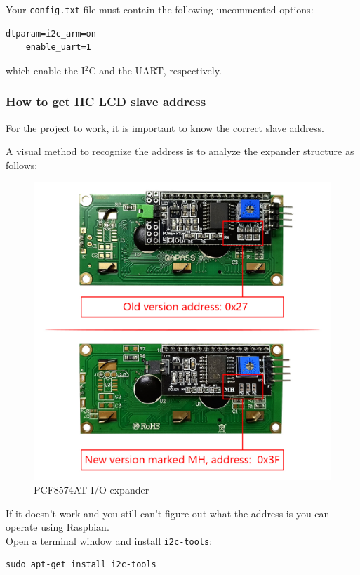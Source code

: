 \documentclass[a4paper, 12pt]{article}
\begin{document}
Your \texttt{config.txt} file must contain the following uncommented options:

\begin{Verbatim}[breaklines=true, breakanywhere=true]
    dtparam=i2c_arm=on
    enable_uart=1
\end{Verbatim}

which enable the I$^2$C and the UART, respectively.

\subsubsection{How to get IIC LCD slave address}

For the project to work, it is important to know the correct slave address.

A visual method to recognize the address is to analyze the expander structure as follows\cite{i2cLcd}:
\begin{figure}[h]
    \includegraphics[width=14cm]{i2c_lcd}
    \centering
    \caption{PCF8574AT I/O expander}
\end{figure}

If it doesn't work and you still can't figure out what the address is you can operate using Raspbian. \\
Open a terminal window and install \texttt{i2c-tools}:
\begin{Verbatim}[breaklines=true, breakanywhere=true]
    sudo apt-get install i2c-tools
\end{Verbatim}
\end{document}
